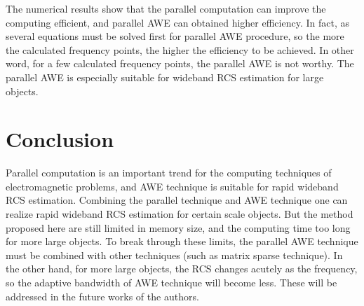 \documentclass[conference, a4paper]{IEEEtran}
\begin{document}
The numerical results show that the parallel computation can improve the 
computing efficient, and parallel AWE can obtained higher efficiency. In 
fact, as several equations must be solved first for parallel AWE procedure, 
so the more the calculated frequency points, the higher the efficiency to be 
achieved. In other word, for a few calculated frequency points, the parallel 
AWE is not worthy. The parallel AWE is especially suitable for wideband RCS 
estimation for large objects.

\section{Conclusion}

Parallel computation is an important trend for the computing techniques of 
electromagnetic problems, and AWE technique is suitable for rapid wideband 
RCS estimation. Combining the parallel technique and AWE technique one can 
realize rapid wideband RCS estimation for certain scale objects. But the 
method proposed here are still limited in memory size, and the computing 
time too long for more large objects. To break through these limits, the 
parallel AWE technique must be combined with other techniques (such as 
matrix sparse technique). In the other hand, for more large objects, the RCS 
changes acutely as the frequency, so the adaptive bandwidth of AWE technique 
will become less. These will be addressed in the future works of the authors.






%
\end{document}
